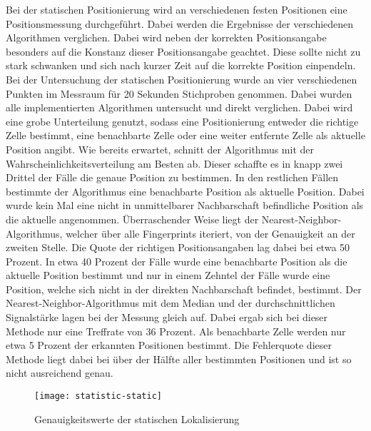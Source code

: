 Bei der statischen Positionierung wird an verschiedenen festen Positionen eine Positionsmessung durchgeführt. Dabei werden die Ergebnisse der verschiedenen Algorithmen verglichen. Dabei wird neben der korrekten Positionsangabe besonders auf die Konstanz dieser Positionsangabe geachtet. Diese sollte nicht zu stark schwanken und sich nach kurzer Zeit auf die korrekte Position einpendeln.
Bei der Untersuchung der statischen Positionierung wurde an vier verschiedenen Punkten im Messraum für 20 Sekunden Stichproben genommen. Dabei wurden alle implementierten Algorithmen untersucht und direkt verglichen.
Dabei wird eine grobe Unterteilung genutzt, sodass eine Positionierung entweder die richtige Zelle bestimmt, eine benachbarte Zelle oder eine weiter entfernte Zelle als aktuelle Position angibt. 
Wie bereits erwartet, schnitt der Algorithmus mit der Wahrscheinlichkeitsverteilung am Besten ab. Dieser schaffte es in knapp zwei Drittel der Fälle die genaue Position zu bestimmen. In den restlichen Fällen bestimmte der Algorithmus eine benachbarte Position als aktuelle Position. Dabei wurde kein Mal eine nicht in unmittelbarer Nachbarschaft befindliche Position als die aktuelle angenommen. 
Überraschender Weise liegt der Nearest-Neighbor-Algorithmus, welcher über alle Fingerprints iteriert, von der Genauigkeit an der zweiten Stelle. Die Quote der richtigen Positionsangaben lag dabei bei etwa 50 Prozent. In etwa 40 Prozent der Fälle wurde eine benachbarte Position als die aktuelle Position bestimmt und nur in einem Zehntel der Fälle wurde eine Position, welche sich nicht in der direkten Nachbarschaft befindet, bestimmt.
Der Nearest-Neighbor-Algorithmus mit dem Median und der durchschnittlichen Signalstärke lagen bei der Messung gleich auf. Dabei ergab sich bei dieser Methode nur eine Treffrate von 36 Prozent. Als benachbarte Zelle werden nur etwa 5 Prozent der erkannten Positionen bestimmt. Die Fehlerquote dieser Methode liegt dabei bei über der Hälfte aller bestimmten Positionen und ist so nicht ausreichend genau.

\begin{figure}[htb!]
		\centering
	\texttt{[image: statistic-static]}
	\caption{Genauigkeitswerte der statischen Lokalisierung}
	\label{statistic-static}
	\end{figure}
 
